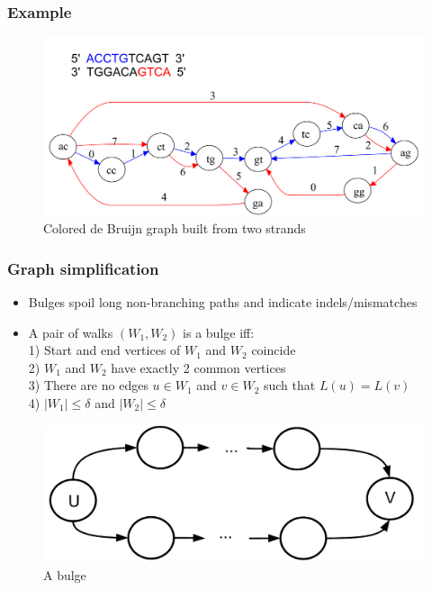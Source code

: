 \documentclass[svgnames,14pt]{beamer}
\begin{document}
\begin{frame}
\frametitle{Example}
\begin{changemargin}{-1.cm}{-1.cm}
\begin{figure}
\centering
\includegraphics[scale = 0.480]{Figure1.pdf}
\small \caption{Colored de Bruijn graph built from two strands}
\end{figure}
\end{changemargin}
\end{frame}

\begin{frame}
\frametitle{Graph simplification}
\begin{itemize}
\item Bulges spoil long non-branching paths and indicate indels/mismatches
\item A pair of walks \((W_{1}, W_{2})\) is a bulge iff: \\
1) Start and end vertices of  \(W_{1} \) and  \(W_{2}\) coincide\\
2) \(W_{1} \) and  \(W_{2}\) have exactly 2 common vertices \\
3) There are no edges \(u \in W_{1} \) and \( v \in W_{2}\) such that \(L(u) = L(v) \) \\
4) \(|W_{1}|  \leq \delta \) and \(|W_{2}| \leq \delta \)
\end{itemize}
\begin{changemargin}{-1.cm}{-1.cm}
\begin{figure}
\centering
\includegraphics[scale = 0.30]{Figure2.pdf}
\small \caption{A bulge}
\end{figure}
\end{changemargin}
\end{frame}
\end{document}
